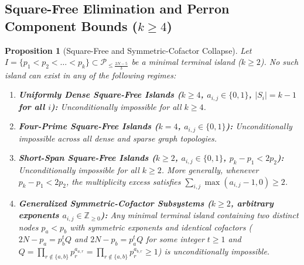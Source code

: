 \documentclass[11pt,a4paper]{article}
\newtheorem{proposition}[theorem]{Proposition}
\theoremstyle{definition}
\begin{document}
\subsection{Square-Free Elimination and Perron Component Bounds (\texorpdfstring{$k \ge 4$}{k >= 4})}
\label{subsec:spectral_barrier}

\begin{proposition}[Square-Free and Symmetric-Cofactor Collapse]
\label{prop:squarefree_collapse}
Let $I = \{p_1 < p_2 < \dots < p_k\} \subset \mathcal{P}_{\le \frac{2N-5}{3}}$ be a minimal terminal island ($k \ge 2$). No such island can exist in any of the following regimes:
\begin{enumerate}
    \item \textbf{Uniformly Dense Square-Free Islands ($k \ge 4$, $a_{i,j} \in \{0, 1\}$, $|S_i| = k - 1$ for all $i$):} Unconditionally impossible for all $k \ge 4$.
    \item \textbf{Four-Prime Square-Free Islands ($k = 4$, $a_{i,j} \in \{0, 1\}$):} Unconditionally impossible across all dense and sparse graph topologies.
    \item \textbf{Short-Span Square-Free Islands ($k \ge 2$, $a_{i,j} \in \{0, 1\}$, $p_k - p_1 < 2p_2$):} Unconditionally impossible for all $k \ge 2$. More generally, whenever $p_k - p_1 < 2p_2$, the multiplicity excess satisfies $\sum_{i,j} \max(a_{i,j} - 1, 0) \ge 2$.
    \item \textbf{Generalized Symmetric-Cofactor Subsystems ($k \ge 2$, arbitrary exponents $a_{i,j} \in \mathbb{Z}_{\ge 0}$):} Any minimal terminal island containing two distinct nodes $p_a < p_b$ with symmetric exponents and identical cofactors ($2N - p_a = p_b^t Q$ and $2N - p_b = p_a^t Q$ for some integer $t \ge 1$ and $Q = \prod_{r \notin \{a,b\}} p_r^{a_{a,r}} = \prod_{r \notin \{a,b\}} p_r^{a_{b,r}} \ge 1$) is unconditionally impossible.
\end{enumerate}
\end{proposition}
\end{document}
